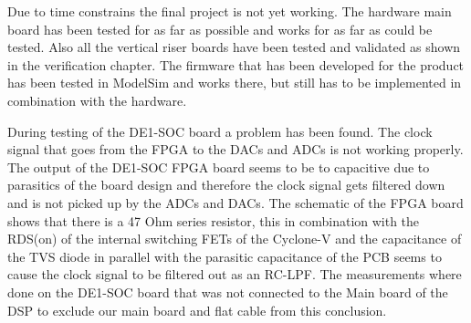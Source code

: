 Due to time constrains the final project is not yet working. The hardware main board has been tested for as far as possible and works for as far as could be tested. Also all the vertical riser boards have been tested and validated as shown in the verification chapter. The firmware that has been developed for the product has been tested in ModelSim and works there, but still has to be implemented in combination with the hardware. 
\par
\noindent During testing of the DE1-SOC board a problem has been found. The clock signal that goes from the FPGA to the DACs and ADCs is not working properly. The output of the DE1-SOC FPGA board seems to be to capacitive due to parasitics of the board design and therefore the clock signal gets filtered down and is not picked up by the ADCs and DACs. The schematic of the FPGA board shows that there is a 47 Ohm series resistor, this in combination with the RDS(on) of the internal switching FETs of the Cyclone-V and the capacitance of the TVS diode in parallel with the parasitic capacitance of the PCB seems to cause the clock signal to be filtered out as an RC-LPF. The measurements where done on the DE1-SOC board that was not connected to the Main board of the DSP to exclude our main board and flat cable from this conclusion.